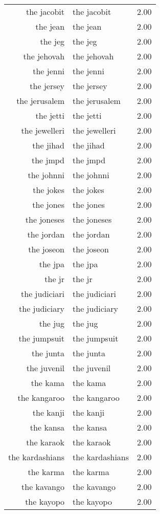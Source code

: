 \begin{table}[ht]
\begin{tabular}{rlr}
  the jacobit & the jacobit & 2.00 \\ 
  the jean & the jean & 2.00 \\ 
  the jeg & the jeg & 2.00 \\ 
  the jehovah & the jehovah & 2.00 \\ 
  the jenni & the jenni & 2.00 \\ 
  the jersey & the jersey & 2.00 \\ 
  the jerusalem & the jerusalem & 2.00 \\ 
  the jetti & the jetti & 2.00 \\ 
  the jewelleri & the jewelleri & 2.00 \\ 
  the jihad & the jihad & 2.00 \\ 
  the jmpd & the jmpd & 2.00 \\ 
  the johnni & the johnni & 2.00 \\ 
  the jokes & the jokes & 2.00 \\ 
  the jones & the jones & 2.00 \\ 
  the joneses & the joneses & 2.00 \\ 
  the jordan & the jordan & 2.00 \\ 
  the joseon & the joseon & 2.00 \\ 
  the jpa & the jpa & 2.00 \\ 
  the jr & the jr & 2.00 \\ 
  the judiciari & the judiciari & 2.00 \\ 
  the judiciary & the judiciary & 2.00 \\ 
  the jug & the jug & 2.00 \\ 
  the jumpsuit & the jumpsuit & 2.00 \\ 
  the junta & the junta & 2.00 \\ 
  the juvenil & the juvenil & 2.00 \\ 
  the kama & the kama & 2.00 \\ 
  the kangaroo & the kangaroo & 2.00 \\ 
  the kanji & the kanji & 2.00 \\ 
  the kansa & the kansa & 2.00 \\ 
  the karaok & the karaok & 2.00 \\ 
  the kardashians & the kardashians & 2.00 \\ 
  the karma & the karma & 2.00 \\ 
  the kavango & the kavango & 2.00 \\ 
  the kayopo & the kayopo & 2.00 \\ 

\end{tabular}
\end{table}
